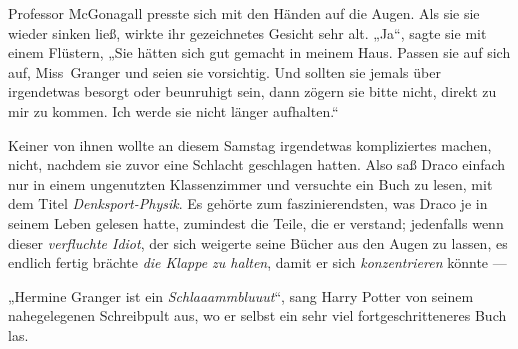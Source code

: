 Professor McGonagall presste sich mit den Händen auf die Augen. Als sie sie wieder sinken ließ, wirkte ihr gezeichnetes Gesicht sehr alt.
„Ja“, sagte sie mit einem Flüstern,
„Sie hätten sich gut gemacht in meinem Haus. Passen sie auf sich auf, Miss~Granger und seien sie vorsichtig. Und sollten sie jemals über irgendetwas besorgt oder beunruhigt sein, dann zögern sie bitte nicht, direkt zu mir zu kommen. Ich werde sie nicht länger aufhalten.“


Keiner von ihnen wollte an diesem Samstag irgendetwas kompliziertes machen, nicht, nachdem sie zuvor eine Schlacht geschlagen hatten. Also saß Draco einfach nur in einem ungenutzten Klassenzimmer und versuchte ein Buch zu lesen, mit dem Titel \emph{Denksport-Physik}.%
Es gehörte zum faszinierendsten, was Draco je in seinem Leben gelesen hatte, zumindest die Teile, die er verstand; jedenfalls wenn dieser \emph{verfluchte Idiot}, der sich weigerte seine Bücher aus den Augen zu lassen, es endlich fertig brächte \emph{die Klappe zu halten}, damit er sich \emph{konzentrieren} könnte —

„Hermine Granger ist ein \emph{Schlaaammbluuut}“, sang Harry Potter von seinem nahegelegenen Schreibpult aus, wo er selbst ein sehr viel fortgeschritteneres Buch las.

